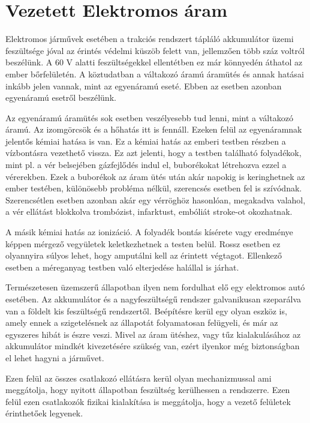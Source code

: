 \section{Vezetett Elektromos áram}

Elektromos járművek esetében a trakciós rendszert tápláló akkumulátor üzemi feszültsége jóval az érintés védelmi küszöb felett van, jellemzően több száz voltról beszélünk. A 60 V alatti feszültségekkel ellentétben ez már könnyedén áthatol az ember bőrfelületén. A köztudatban a váltakozó áramú áramütés és annak hatásai inkább jelen vannak, mint az egyenáramú eseté. Ebben az esetben azonban egyenáramú esetről beszélünk.

Az egyenáramú áramütés sok esetben veszélyesebb tud lenni, mint a váltakozó áramú. Az izomgörcsök és a hőhatás itt is fennáll. Ezeken felül az egyenáramnak jelentős kémiai hatása is van. Ez a kémiai hatás az emberi testben részben a vízbontásra vezethető vissza. Ez azt jelenti, hogy a testben található folyadékok, mint pl. a vér belsejében gázfejlődés indul el, buborékokat létrehozva ezzel a  vérerekben. Ezek a buborékok az áram ütés után akár napokig is keringhetnek az ember testében, különösebb probléma nélkül, szerencsés esetben fel is szívódnak. Szerencsétlen esetben azonban akár egy vérröghöz hasonlóan, megakadva valahol, a vér ellátást blokkolva trombózist, infarktust, embóliát stroke-ot okozhatnak.

A másik kémiai hatás az ionizáció. A folyadék bontás kísérete vagy eredménye képpen mérgező vegyületek keletkezhetnek a testen belül. Rossz esetben ez olyannyira súlyos lehet, hogy amputálni kell az érintett végtagot. Ellenkező esetben a méreganyag testben való elterjedése halállal is járhat.

Természetesen üzemszerű állapotban ilyen nem fordulhat elő egy elektromos autó esetében. Az akkumulátor és a nagyfeszültségű rendszer galvanikusan szeparálva van a földelt kis feszültségű rendszertől. Beépítésre kerül egy olyan eszköz is, amely ennek a szigetelésnek az állapotát folyamatosan felügyeli, és már az egyszeres hibát is észre veszi. Mivel az áram ütéshez, vagy tűz kialakulásához az akkumulátor mindkét kivezetésére szükség van, ezért ilyenkor még biztonságban el lehet hagyni a járművet.

Ezen felül az összes csatlakozó ellátásra kerül olyan mechanizmussal ami meggátolja, hogy nyitott állapotban feszültség kerülhessen a rendszerre. Ezen felül ezen csatlakozók fizikai kialakítása is meggátolja, hogy a vezető felületek érinthetőek legyenek.

